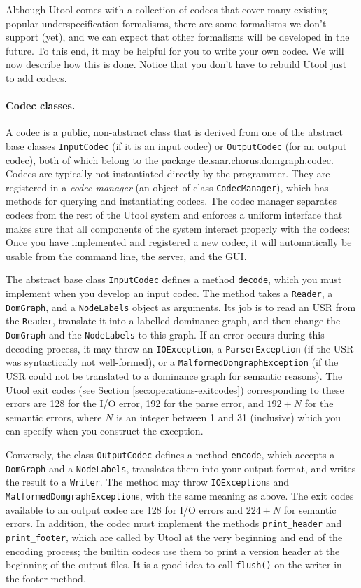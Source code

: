 Although Utool comes with a collection of codecs that cover many
existing popular underspecification formalisms, there are some
formalisms we don't support (yet), and we can expect that other
formalisms will be developed in the future. To this end, it may be
helpful for you to write your own codec. We will now describe how this is done. Notice that you don't have to rebuild Utool just to add codecs.

\paragraph{Codec classes.}
A codec is a public, non-abstract class that is derived from one of the abstract base classes
\verb?InputCodec? (if it is an input codec) or \verb?OutputCodec? (for an output codec), both of which belong to the package \url{de.saar.chorus.domgraph.codec}. Codecs
are typically not instantiated directly by the programmer. They are registered in
a \emph{codec manager} (an object of class \verb?CodecManager?),
which has methods for querying and instantiating codecs. The codec
manager separates codecs from the rest of the Utool system and enforces
a uniform interface that makes sure that all components of the system
interact properly with the codecs: Once you have implemented and
registered a new codec, it will automatically be usable from the command
line, the server, and the GUI.

The abstract base class \verb?InputCodec? defines a method \verb?decode?,
which you must implement when you develop an input codec. The method
takes a \verb?Reader?, a \verb?DomGraph?, and a \verb?NodeLabels? object
as arguments. Its job is to read an USR from the \verb?Reader?, translate it
into a labelled dominance graph, and then change the \verb?DomGraph? and
the \verb?NodeLabels? to this graph. If an error occurs during this decoding
process, it may throw an \verb?IOException?, a \verb?ParserException? (if the
USR was syntactically not well-formed), or a \verb?MalformedDomgraphException?
(if the USR could not be translated to a dominance graph for semantic reasons).
The Utool exit codes (see Section \ref{sec:operations-exitcodes}) 
corresponding to these errors are 128 for the I/O error,
192 for the parse error, and $192+N$ for the semantic errors, where $N$ is
an integer between 1 and 31 (inclusive) which you can specify when you construct
the exception.

Conversely, the class \verb?OutputCodec? defines a method \verb?encode?, which
accepts a \verb?DomGraph? and a \verb?NodeLabels?, translates them into your
output format, and writes the result to a \verb?Writer?. The method may throw
\verb?IOException?s and \verb?MalformedDomgraphException?s, with the same meaning
as above. The exit codes available to an output codec are 128 for I/O errors
and $224 + N$ for semantic errors. 
In addition, the codec must implement the methods \verb?print_header? and
\verb?print_footer?, which are called by Utool at the very beginning and end of the
encoding process; the builtin codecs use them to print a version header at the beginning 
of the output files. It is a good idea to call \verb?flush()? on the writer in the footer method.

